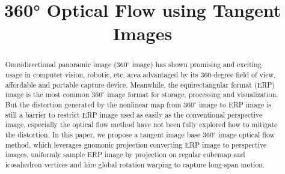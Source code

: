\documentclass{bmvc2k}
\title{360\!° Optical Flow using Tangent Images}
\begin{document}
\maketitle

\begin{abstract}

Omnidirectional panoramic image ($360^\circ$ image) has shown promising and exciting usage in computer vision, robotic, etc. area advantaged by its 360-degree field of view, affordable and portable capture device.
Meanwhile, the equirectangular format (ERP) image is the most common $360^\circ$ image format for storage, processing and visualization.
But the distortion generated by the nonlinear map from $360^\circ$ image to ERP image is still a barrier to restrict ERP image used as easily as the conventional perspective image, especially the optical flow method have not been fully explored how to mitigate the distortion.
In this paper, we propose a tangent image base $360^\circ$ image optical flow method, which leverages gnomonic projection converting ERP image to perspective images, uniformly sample ERP image by projection on regular cubemap and icosahedron vertices and hire global rotation warping to capture long-span motion.

\end{abstract}













\end{document}
